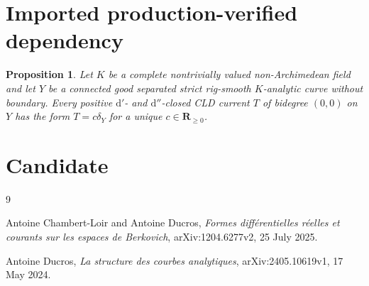 \documentclass[11pt]{article}
\newtheorem{proposition}{Proposition}
\begin{document}
\section*{Imported production-verified dependency}

\begin{proposition}
\label{prop:p21p3-gfc-smooth-rigidity}
Let $K$ be a complete nontrivially valued non-Archimedean field and let
$Y$ be a connected good separated strict rig-smooth $K$-analytic curve
without boundary.  Every positive $\mathrm d'$- and
$\mathrm d''$-closed CLD current $T$ of bidegree $(0,0)$ on $Y$ has the
form $T=c\delta_Y$ for a unique $c\in\mathbf R_{\geq0}$.
\end{proposition}

\section*{Candidate}




\begin{sloppypar}
\begin{thebibliography}{9}
\raggedright

Antoine Chambert-Loir and Antoine Ducros,
\emph{Formes diff\'erentielles r\'eelles et courants sur les espaces de
Berkovich}, arXiv:1204.6277v2, 25 July 2025.

Antoine Ducros,
\emph{La structure des courbes analytiques}, arXiv:2405.10619v1,
17 May 2024.

\end{thebibliography}
\end{sloppypar}
\end{document}

